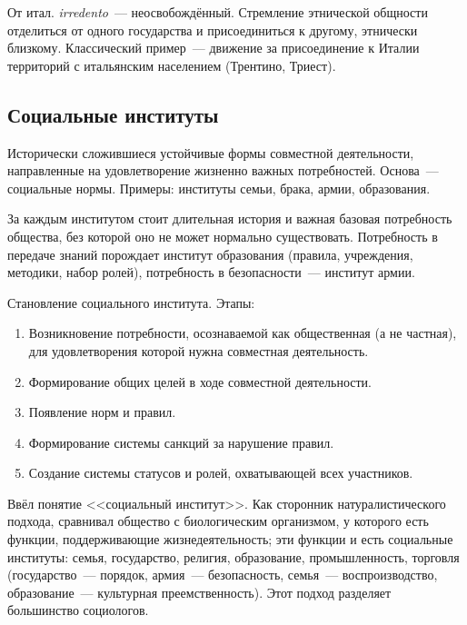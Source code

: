 \documentclass[12pt]{article}
\begin{document}
	\begin{definition}[Ирредентизм]
		От итал. \textit{irredento}~--- неосвобождённый. Стремление этнической общности отделиться от одного государства и присоединиться к другому, этнически близкому. Классический пример~--- движение за присоединение к Италии территорий с итальянским населением (Трентино, Триест).
	\end{definition}

	\subsection{Социальные институты}

	\begin{definition}
		Исторически сложившиеся устойчивые формы совместной деятельности, направленные на удовлетворение жизненно важных потребностей. Основа~--- социальные нормы. Примеры: институты семьи, брака, армии, образования.
	\end{definition}

	\begin{note}
		За каждым институтом стоит длительная история и важная базовая потребность общества, без которой оно не может нормально существовать. Потребность в передаче знаний порождает институт образования (правила, учреждения, методики, набор ролей), потребность в безопасности~--- институт армии.
	\end{note}

	\begin{definition}[Институционализация]
		Становление социального института. Этапы:
		\begin{enumerate}
			\item Возникновение потребности, осознаваемой как общественная (а не частная), для удовлетворения которой нужна совместная деятельность.
			\item Формирование общих целей в ходе совместной деятельности.
			\item Появление норм и правил.
			\item Формирование системы санкций за нарушение правил.
			\item Создание системы статусов и ролей, охватывающей всех участников.
		\end{enumerate}
	\end{definition}

	\begin{person}
		Ввёл понятие <<социальный институт>>. Как сторонник натуралистического подхода, сравнивал общество с биологическим организмом, у которого есть функции, поддерживающие жизнедеятельность; эти функции и есть социальные институты: семья, государство, религия, образование, промышленность, торговля (государство~--- порядок, армия~--- безопасность, семья~--- воспроизводство, образование~--- культурная преемственность). Этот подход разделяет большинство социологов.
	\end{person}
\end{document}
